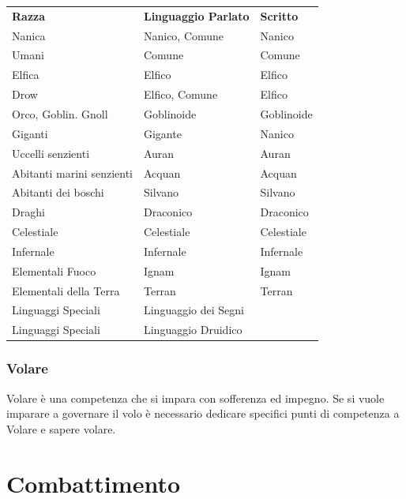 \documentclass[a4paper,11pt,twoside,openany]{book}
\begin{document}
\begin{tabular}{lll}
	\toprule
	\textbf{Razza}            & \textbf{Linguaggio Parlato} & \textbf{Scritto}\\
	Nanica                    & Nanico, Comune              & Nanico\\
	Umani                     & Comune                      & Comune\\
	Elfica                    & Elfico                      & Elfico\\
	Drow                      & Elfico, Comune              & Elfico\\
	Orco, Goblin. Gnoll       & Goblinoide                  & Goblinoide\\
	Giganti                   & Gigante                     & Nanico\\
	Uccelli senzienti         & Auran                       & Auran\\
	Abitanti marini senzienti & Acquan                      & Acquan\\
	Abitanti dei boschi       & Silvano                     & Silvano\\
	Draghi                    & Draconico                   & Draconico\\
	Celestiale                & Celestiale                  & Celestiale\\
	Infernale                 & Infernale                   & Infernale\\
	Elementali Fuoco          & Ignam                       & Ignam\\
	Elementali della Terra    & Terran                      & Terran\\
	Linguaggi Speciali		  & Linguaggio dei Segni&\\ 
	Linguaggi Speciali		  & Linguaggio Druidico&\\ 
\end{tabular}

\subsubsection{Volare}

\label{volare}

Volare è una competenza che si impara con sofferenza ed impegno. Se si vuole imparare a governare il volo è necessario dedicare specifici punti di competenza a Volare e sapere volare.

\pagebreak

\section{Combattimento}
\end{document}
